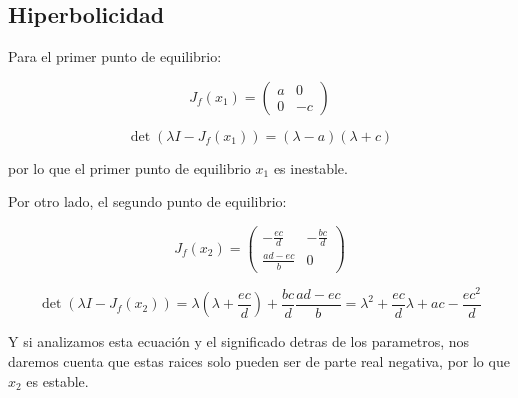         \subsection{Hiperbolicidad}

            Para el primer punto de equilibrio:

            \begin{equation*}
                J_f(x_1) =
                \begin{pmatrix}
                    a & 0 \\
                    0 & -c
                \end{pmatrix}
            \end{equation*}

            \begin{equation*}
                \det{(\lambda I - J_f(x_1))} = \left( \lambda - a \right) \left( \lambda + c \right)
            \end{equation*}

            por lo que el primer punto de equilibrio $x_1$ es inestable.

            Por otro lado, el segundo punto de equilibrio:

            \begin{equation*}
                J_f(x_2) =
                \begin{pmatrix}
                    -\frac{ec}{d} & - \frac{bc}{d} \\
                    \frac{ad - ec}{b} & 0
                \end{pmatrix}
            \end{equation*}

            \begin{equation*}
                \det{(\lambda I - J_f(x_2))} = \lambda \left( \lambda + \frac{ec}{d} \right) + \frac{bc}{d} \frac{ad - ec}{b} = \lambda^2 + \frac{ec}{d} \lambda + ac - \frac{ec^2}{d}
            \end{equation*}

            Y si analizamos esta ecuación y el significado detras de los parametros, nos daremos cuenta que estas raices solo pueden ser de parte real negativa, por lo que $x_2$ es estable.


